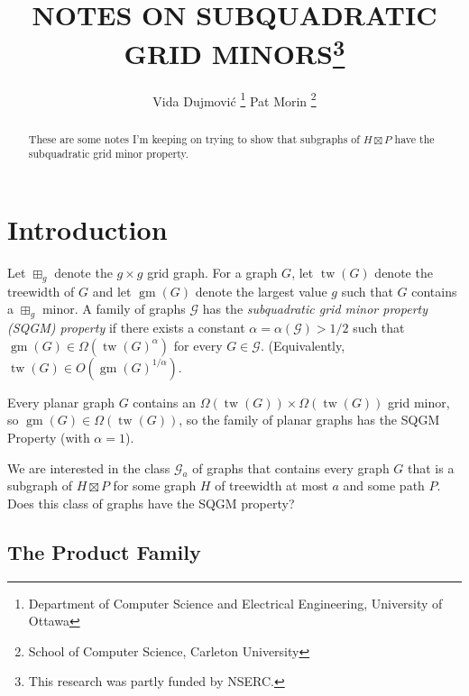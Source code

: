 \documentclass{patmorin}
\title{\MakeUppercase{Notes on Subquadratic Grid Minors}\thanks{This research was partly funded by NSERC.}}
\author{Vida Dujmović%
    \thanks{Department of Computer Science and Electrical Engineering, University of Ottawa}\qquad
    Pat Morin%
    \thanks{School of Computer Science, Carleton University}}
\date{}
\DeclareMathOperator{\tw}{tw}
\DeclareMathOperator{\gm}{gm}
\begin{document}
\maketitle

\begin{abstract}
    These are some notes I'm keeping on trying to show that subgraphs of $H\boxtimes P$ have the subquadratic grid minor property.
\end{abstract}

%



\section{Introduction}

Let $\boxplus_g$ denote the $g\times g$ grid graph.
For a graph $G$, let $\tw(G)$ denote the treewidth of $G$ and let $\gm(G)$ denote the largest value $g$ such that $G$ contains a $\boxplus_g$ minor.
A family of graphs $\mathcal{G}$ has the \emph{subquadratic grid minor property (SQGM) property} if there exists a constant $\alpha =\alpha(\mathcal{G}) > 1/2$ such that $\gm(G)\in\Omega(\tw(G)^{\alpha})$ for every $G\in\mathcal{G}$.  (Equivalently, $\tw(G)\in O(\gm(G)^{1/\alpha})$.


Every planar graph $G$ contains an $\Omega(\tw(G))\times\Omega(\tw(G))$ grid minor, so $\gm(G)\in\Omega(\tw(G))$, so the family of planar graphs has the SQGM Property (with $\alpha=1$).

We are interested in the class $\mathcal{G}_a$ of graphs that contains every graph $G$ that is a subgraph of $H\boxtimes P$ for some graph $H$ of treewidth at most $a$ and some path $P$.  Does this class of graphs have the SQGM property?

\subsection{The Product Family}
\end{document}
